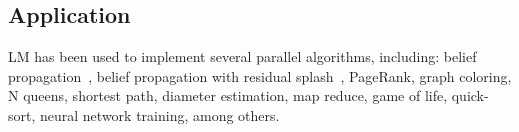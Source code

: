 \subsection{Application}

LM has been used to implement several parallel algorithms, including: belief propagation~\cite{Gonzalez+al:aistats09paraml},
belief propagation with residual splash~\cite{Gonzalez+al:aistats09paraml}, PageRank, graph coloring,
N queens, shortest path, diameter estimation, map reduce, game of life, quick-sort, neural network training, among others.